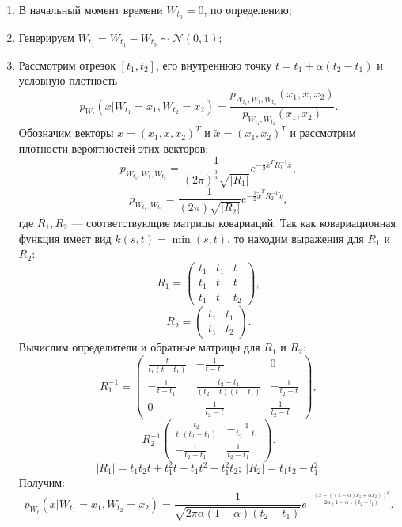 \documentclass[11pt]{article}
\begin{document}
\begin{enumerate}
	\item В начальный момент времени $W_{t_0} = 0$, по определению;
	\item Генерируем $W_{t_1} = W_{t_1} - W_{t_0} \sim \mathcal{N}(0,1)$;
	\item Рассмотрим отрезок $[t_1,t_2]$, его внутреннюю точку $t = t_1 + \alpha(t_2 - t_1)$ и условную плотность
	\[ p_{W_t}(x|W_{t_1} = x_1,W_{t_2} = x_2) = \frac{p_{W_{t_1},W_t,W_{t_2}}(x_1,x,x_2)}{p_{W_{t_1},W_{t_2}}(x_1,x_2)}. \]
	Обозначим векторы $\overline{x} = (x_1,x,x_2)^T$ и $\tilde{x} = (x_1,x_2)^T$ и рассмотрим плотности вероятностей этих векторов:
	\[ p_{W_{t_1},W_t,W_{t_2}} = \frac{1}{(2\pi)^\frac{3}{2}\sqrt{|R_1|}}e^{-\frac{1}{2}\overline{x}^TR_1^{-1}\overline{x}}, \]
	\[ p_{W_{t_1},W_{t_2}} = \frac{1}{(2\pi)\sqrt{|R_2|}}e^{-\frac{1}{2}\tilde{x}^TR_2^{-1}\tilde{x}}, \]
	где $R_1,R_2$ --- соответствующие матрицы ковариаций. Так как ковариационная функция имеет вид $k(s,t) = \min (s,t)$, то находим выражения для $R_1$ и $R_2$:
	\[ R_1 = \begin{pmatrix}
	t_1 & t_1 & t \\
	t_1 & t & t \\
	t_1 & t & t_2
	\end{pmatrix},   \]
		\[ R_2 = \begin{pmatrix}
	t_1 & t_1  \\
	t_1 & t_2
	\end{pmatrix}.  \]
	Вычислим определители и обратные матрицы для $R_1$ и $R_2$:
	\[ R_1^{-1} = \begin{pmatrix}
	  \frac{t}{t_1(t - t_1)}& -\frac{1}{t - t_1} & 0\\
	  -\frac{1}{t - t_1}&  \frac{t_2 - t_1}{(t_2 - t)(t - t_1)}& -\frac{1}{t_2 - t} \\
	  0& -\frac{1}{t_2 - t} & \frac{1}{t_2 - t}
 	\end{pmatrix}, \]
 	\[ R_2^{-1} \begin{pmatrix}
 	\frac{t_2}{t_1(t_2 - t_1)}& -\frac{1}{t_2 - t_1} \\
 	-\frac{1}{t_2 - t_1}& \frac{1}{t_2 - t_1}
 	\end{pmatrix}. \]
 	\[ |R_1| = t_1t_2t + t_1^2t - t_1t^2 - t_1^2t_2; \ |R_2| = t_1t_2 - t_1^2. \]
 	Получим:
 	\[ p_{W_t}(x|W_{t_1} = x_1, W_{t_2} = x_2) = \frac{1}{\sqrt{2\pi\alpha(1 - \alpha)(t_2 - t_1)}} e^{-\frac{(x - ((1 - \alpha)x_1 + \alpha x_2))^2}{2\alpha(1 - \alpha)(t_2 - t_1)}}. \]
\end{enumerate}
\end{document}
